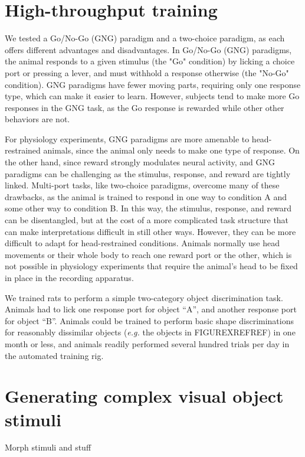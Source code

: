 \section{High-throughput training}


We tested a Go/No-Go (GNG) paradigm and a two-choice paradigm, as each offers different advantages and disadvantages. In Go/No-Go (GNG) paradigms, the animal responds to a given stimulus (the "Go" condition) by licking a choice port or pressing a lever, and must withhold a response otherwise (the "No-Go" condition). GNG paradigms have fewer moving parts, requiring only one response type, which can make it easier to learn. However, subjects tend to make more Go responses in the GNG task, as the Go response is rewarded while other other behaviors are not\cite{REFREF}. 

For physiology experiments, GNG paradigms are more amenable to head-restrained animals, since the animal only needs to make one type of response. On the other hand, since reward strongly modulates neural activity, and GNG paradigms can be challenging as the stimulus, response, and reward are tightly linked\cite{REFREF}. Multi-port tasks, like two-choice paradigms, overcome many of these drawbacks, as the animal is trained to respond in one way to condition A and some other way to condition B. In this way, the stimulus, response, and reward can be disentangled, but at the cost of a more complicated task structure that can make interpretations difficult in still other ways. However, they can be more difficult to adapt for head-restrained conditions. Animals normally use head movements or their whole body to reach one reward port or the other\cite{REFREF}, which is not possible in physiology experiments that require the animal's head to be fixed in place in the recording apparatus. 



We trained rats to perform a simple two-category object discrimination task. Animals had to lick one response port for object ``A'', and another response port for object ``B''.  Animals could be trained to perform basic shape discriminations for reasonably dissimilar objects (\textit{e.g.} the objects in FIGUREXREFREF) in one month or less, and animals readily performed several hundred trials per day in the automated training rig. 

\section{Generating complex visual object stimuli}
Morph stimuli and stuff

